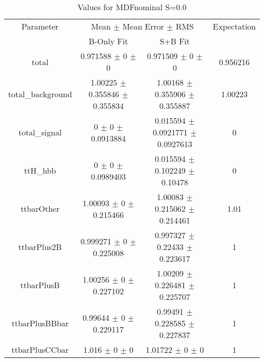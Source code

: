 \begin{table}
\centering
\caption{Values for MDFnominal S=0.0}
\begin{tabular}{cccc}
\toprule
Parameter & \multicolumn{2}{c}{Mean $\pm$ Mean Error $\pm$ RMS} & Expectation\\
 & B-Only Fit & S+B Fit & \\
\midrule
total & \num{0.971588} $\pm$ \num{0} $\pm$ \num{0} & \num{0.971509} $\pm$ \num{0} $\pm$ \num{0} & \num{0.956216}\\
total\_background & \num{1.00225} $\pm$ \num{0.355846} $\pm$ \num{0.355834} & \num{1.00168} $\pm$ \num{0.355906} $\pm$ \num{0.355887} & \num{1.00223}\\
total\_signal & \num{0} $\pm$ \num{0} $\pm$ \num{0.0913884} & \num{0.015594} $\pm$ \num{0.0921771} $\pm$ \num{0.0927613} & \num{0}\\
ttH\_hbb & \num{0} $\pm$ \num{0} $\pm$ \num{0.0989403} & \num{0.015594} $\pm$ \num{0.102249} $\pm$ \num{0.10478} & \num{0}\\
ttbarOther & \num{1.00093} $\pm$ \num{0} $\pm$ \num{0.215466} & \num{1.00083} $\pm$ \num{0.215062} $\pm$ \num{0.214461} & \num{1.01}\\
ttbarPlus2B & \num{0.999271} $\pm$ \num{0} $\pm$ \num{0.225008} & \num{0.997327} $\pm$ \num{0.22433} $\pm$ \num{0.223617} & \num{1}\\
ttbarPlusB & \num{1.00256} $\pm$ \num{0} $\pm$ \num{0.227102} & \num{1.00209} $\pm$ \num{0.226481} $\pm$ \num{0.225707} & \num{1}\\
ttbarPlusBBbar & \num{0.99644} $\pm$ \num{0} $\pm$ \num{0.229117} & \num{0.99491} $\pm$ \num{0.228585} $\pm$ \num{0.227837} & \num{1}\\
ttbarPlusCCbar & \num{1.016} $\pm$ \num{0} $\pm$ \num{0} & \num{1.01722} $\pm$ \num{0} $\pm$ \num{0} & \num{1}\\
\bottomrule
\end{tabular}
\end{table}